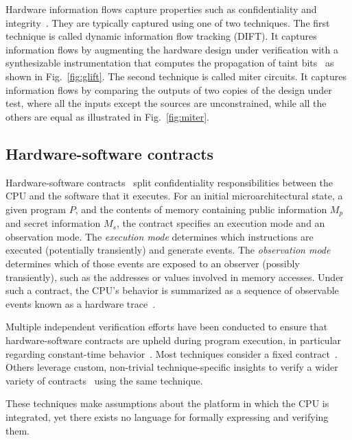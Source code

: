 Hardware information flows capture properties such as confidentiality and integrity~\cite{hu2021hardware}.
They are typically captured using one of two techniques.
The first technique is called dynamic information flow tracking (DIFT).
It captures information flows by augmenting the hardware design under verification with a synthesizable instrumentation that computes the propagation of taint bits~\cite{tiwari2009complete,ardeshiricham2017register,solt2022cellift,solt2024hybridift,ceesay2024mucfi} as shown in Fig.~\ref{fig:glift}.
The second technique is called miter circuits.
It captures information flows by comparing the outputs of two copies of the design under test, where all the inputs except the sources are unconstrained, while all the others are equal as illustrated in Fig.~\ref{fig:miter}.

\subsection{Hardware-software contracts}
\label{subsec:hw-sw-contracts}

Hardware-software contracts~\cite{guarnieri2021hardware} split confidentiality responsibilities between the CPU and the software that it executes.
For an initial microarchitectural state, a given program $P$, and the contents of memory containing public information $M_p$ and secret information $M_s$, the contract specifies an execution mode and an observation mode.
The \emph{execution mode} determines which instructions are executed (potentially transiently) and generate events.
The \emph{observation mode} determines which of those events are exposed to an observer (possibly transiently), such as the addresses or values involved in memory accesses.
Under such a contract, the CPU's behavior is summarized as a sequence of observable events known as a hardware trace~\cite{guarnieri2021hardware,oleksenko2022revizor}.

Multiple independent verification efforts have been conducted to ensure that hardware-software contracts are upheld during program execution, in particular regarding constant-time behavior~\cite{dinesh2024conjunct,ceesay2024mucfi,guarnieri2021hardware,tan2025contractshadowlogic,dinesh2025h,hsiao2024rtl2mmupath,wang2023specification}.
Most techniques consider a fixed contract~\cite{dinesh2024conjunct,ceesay2024mucfi,tan2025contractshadowlogic,dinesh2025h}.
Others leverage custom, non-trivial technique-specific insights to verify a wider variety of contracts~\cite{hsiao2024rtl2mmupath,wang2023specification} using the same technique.

These techniques make assumptions about the platform in which the CPU is integrated, yet there exists no language for formally expressing and verifying them.
